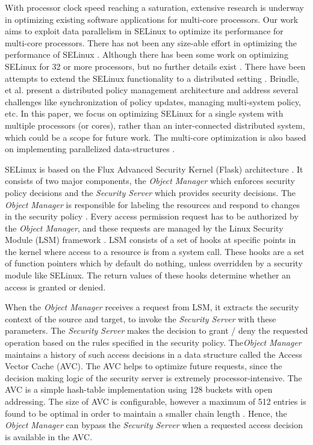 \documentclass[conference]{IEEEtran}
\begin{document}
With processor clock speed reaching a saturation, extensive research is underway in optimizing existing software applications for multi-core processors. Our work aims to exploit data parallelism in SELinux to optimize its performance for multi-core processors. There has not been any size-able effort in optimizing the performance
of SELinux \cite{selinuxFAQ}. Although there has been some work on
optimizing SELinux for 32 or more processors, but no further details
exist \cite{selinuxFAQ}. There have been attempts to extend the SELinux functionality to a distributed setting \cite{tresys}.  Brindle, et al. \cite{tresys} present a distributed policy
management architecture and address several challenges like
synchronization of policy updates, managing multi-system policy,
etc. In this paper, we focus on optimizing SELinux for a single system
with multiple processors (or cores), rather than an inter-connected distributed
system, which could be a scope for future work. The multi-core optimization is also based on implementing parallelized data-structures \cite{ll1}.

SELinux is based on the Flux Advanced Security Kernel (Flask)
architecture \cite{flask}. It consists of two major components, the
\emph{Object Manager} which enforces security policy decisions and the
\emph{Security Server} which provides security decisions. The \emph{Object
Manager} is responsible for labeling the resources and respond to
changes in the security policy \cite{flask}. Every access permission
request has to be authorized by the \emph{Object Manager}, and these requests
are managed by the Linux Security Module (LSM) framework
\cite{selinuxBook}. LSM consists of a set of hooks at specific points
in the kernel where access to a resource is from a system call. These
hooks are a set of function pointers which by default do nothing,
unless overridden by a security module like SELinux. The return values
of these hooks determine whether an access is granted or denied.

When the \emph{Object Manager} receives a request from LSM, it
extracts the security context of the source and target, to invoke the
\emph{Security Server} with these parameters. The \emph{Security Server} makes the
decision to grant / deny the requested operation based on the rules
specified in the security policy. The\emph{Object Manager} maintains a
history of such access decisions in a data structure called the Access
Vector Cache (AVC). The AVC helps to optimize future requests, since
the decision making logic of the security server is extremely
processor-intensive. The AVC is a simple hash-table implementation
using 128 buckets with open addressing. The size of AVC is
configurable, however a maximum of 512 entries is found to be optimal
in order to maintain a smaller chain length \cite{selinuxBook}. Hence,
the \emph{Object Manager} can bypass the \emph{Security Server} when a requested
access decision is available in the AVC.
\end{document}
